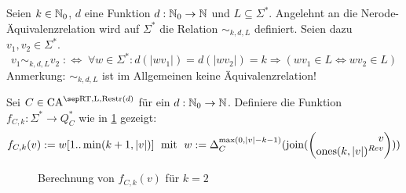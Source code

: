 \begin{definition}
    Seien $k \in \mathbb{N}_0$, $d$ eine Funktion $d: \mathbb{N}_0 \to \mathbb{N}$ und $L \subseteq \Sigma^*$.
    Angelehnt an die Nerode-Äquivalenzrelation wird auf $\Sigma^*$ die Relation $\sim_{k,d,L}$ definiert.
    Seien dazu $v_1, v_2 \in \Sigma^*$.
    \[
        v_1 \sim_{k,d,L} v_2 \; :\Leftrightarrow \; \forall w \in \Sigma^*: d(|wv_1|) = d(|wv_2|) = k \Rightarrow (wv_1 \in L \Leftrightarrow wv_2 \in L)
    \]
    Anmerkung: $\sim_{k,d,L}$ ist im Allgemeinen keine Äquivalenzrelation!
\end{definition}

\begin{definition}
    Sei $C \in \CAM{\CART, \CALeft, \CARestr(d)}$ für ein $d: \mathbb{N}_0 \to \mathbb{N}$. Definiere die Funktion $f_{C, k}: \Sigma^* \to Q_C^*$
    wie in \cref{fig:RestrAutomata_fCk} gezeigt:
    \[
        f_{C, k}(v) := w[1..\min(k+1, |v|)] \; \text{ mit } \; w := \Delta_C^{\max(0, |v|-k-1)}(  \joinw(\Spvek{ v; \mathrm{ones}(k, |v|)^{Rev} })  )
    \]
    
    \begin{figure}[h!]
        \centering
        
        \caption{Berechnung von $f_{C,k}(v)$ für $k = 2$}
        \label{fig:RestrAutomata_fCk}
    \end{figure}
    
\end{definition}

